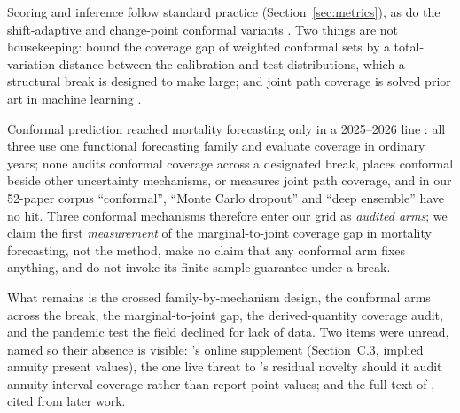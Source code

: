 Scoring and inference follow standard practice (Section~\ref{sec:metrics}), as do
the shift-adaptive and change-point conformal variants
\citep{tashman2000out,nosek2018preregistration,tibshirani2019conformal,gibbs2021adaptive,gibbs2024conformal,sun2025conformal,romano2019conformalized,angelopoulos2023gentle}.
Two things are not housekeeping: \citet{barber2023conformal} bound the
coverage gap of weighted conformal sets by a total-variation distance between the
calibration and test distributions, which a structural break is designed to make
large; and joint path coverage is solved prior art in machine learning
\citep{stankeviciute2021conformal,sun2024copula,messoudi2021copula,diquigiovanni2022conformal}.

Conformal prediction reached mortality forecasting only in a 2025--2026 line
\citep{shang2025intervals,shang2026conformal,shang2026subnational}: all three use
one functional forecasting family and evaluate coverage in ordinary years; none
audits conformal coverage across a designated break, places conformal beside other
uncertainty mechanisms, or measures joint path coverage, and in our 52-paper corpus
``conformal'', ``Monte Carlo dropout'' and ``deep ensemble'' have no hit. Three conformal mechanisms therefore enter our grid as
\emph{audited arms}; we claim the first \emph{measurement} of the marginal-to-joint
coverage gap in mortality forecasting, not the method, make no claim that any
conformal arm fixes anything, and do not invoke its finite-sample guarantee under a
break.

What remains is the crossed family-by-mechanism design, the conformal arms across
the break, the marginal-to-joint gap, the derived-quantity coverage audit, and the
pandemic test the field declined for lack of data. Two items were unread, named
so their absence is visible:
\citet{schnurch2022point}'s online supplement (Section~C.3, implied annuity present
values), the one live threat to \Hfive's residual novelty should it audit
annuity-interval coverage rather than report point values; and the full text of
\citet{stankeviciute2021conformal}, cited from later work.
